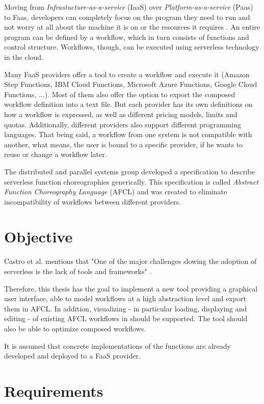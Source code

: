 \documentclass[a4paper,12pt,pdftex,halfparskip,cleardoubleempty,bibtotoc,liststotoc]{scrbook}
\begin{document}
Moving from \emph{Infrastucture-as-a-service} (IaaS) over \emph{Platform-as-a-service} (Paas) to Faas, developers can completely focus on the program they need to run and not worry at all about the machine it is on or the resources it requires \cite{articles-going-serverless-savage}.
An entire program can be defined by a workflow, which in turn consists of functions and control structure. Workflows, though, can be executed using serverless technology in the cloud.

Many FaaS providers offer a tool to create a workflow and execute it (Amazon Step Functions, IBM Cloud Functions, Microsoft Azure Functions, Google Cloud Functions, ...). Most of them also offer the option to export the composed workflow definition into a text file.
But each provider has its own definitions on how a workflow is expressed, as well as different pricing models, limits and quotas. Additionally, different providers also support different programming languages. That being said, a workflow from one system is not compatible with another, what means, the user is bound to a specific provider, if he wants to reuse or change a workflow later.

The distributed and parallel systems group developed a specification to describe serverless function choreographies generically. This specification is called \emph{Abstract Function Choreography Language} (AFCL) and was created to eliminate incompatibility of workflows between different providers.

\section{Objective}

Castro et al. mentions that "One of the major challenges slowing the adoption of serverless is the lack of tools and frameworks" \cite{articles-rise-of-serverless-castro}. 

Therefore, this thesis has the goal to implement a new tool providing a graphical user interface, able to model workflows at a high abstraction level and export them in AFCL. In addition, visualizing - in particular loading, displaying and editing - of existing AFCL workflows in should be supported.
The tool should also be able to optimize composed workflows.

It is assumed that concrete implementations of the functions are already developed and deployed to a FaaS provider.
  
\section{Requirements}
\end{document}
